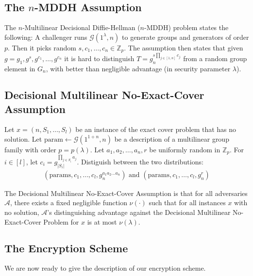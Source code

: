 \subsection{The $n$-MDDH Assumption  }

The $n$-Multilinear Decisional Diffie-Hellman ($n$-MDDH) problem states the following: A challenger runs $\mathcal{G}(1^{\lambda},n ) $ to generate groups and generators of order $p$. Then it picks random $s, c_1, \ldots, c_n  \in \mathbb{Z}_p$.  The assumption then states that given $g= g_1, g^{s}, g^{c_1}, \ldots,g^{c_n}$ it is hard to distinguish $T = g_n^{s \prod_{j \in [1,n ] } c_j}$ from a random group element in $G_n$, with better than negligible advantage (in security parameter $\lambda$).

\newpage


\subsection{Decisional Multilinear  No-Exact-Cover  Assumption}
Let $x = (n, S_1, \ldots, S_l)$ be an instance of the exact cover problem that has no solution. Let $\mathrm{param} \leftarrow \mathcal{G}(1^{1+n},n)$ be a description of a multilinear group family with order $p = p(\lambda)$. Let $a_1, a_2, \ldots, a_n,r$ be uniformly random in $\mathbb{Z}_p$. For $i \in [l]$, let $c_i  = g_{|S_i|}^{ \prod_{j \in S_i} a_j}$. Distiguish between the two distributions:
\begin{align*}
(\mathrm{params}, c_1, \ldots,c_l,g_n^{a_1a_2\ldots a_n}) \text{ and } (\mathrm{params},c_1, \ldots,c_l,g_n^r)
\end{align*}

The Decisional Multilinear No-Exact-Cover Assumption is that for all adversaries $\mathcal{A}$, there exists a fixed negligible function $\nu(\cdot)$ such that for all instances $x$ with no solution, $\mathcal{A}$'s distinguishing advantage against the Decisional Multilinear No-Exact-Cover Problem  for $x$ is at most $\nu(\lambda)$.

\subsection{The Encryption Scheme  }

We are now ready to give the description of our encryption scheme.

